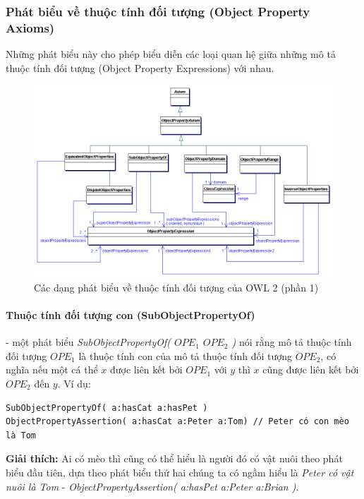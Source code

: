 \subsubsection{Phát biểu về thuộc tính đối tượng (Object Property Axioms)}
Những phát biểu này cho phép biểu diễn các loại quan hệ giữa những mô tả thuộc tính đối tượng (Object Property Expressions) với nhau.
\begin{figure}[h]
	\centering
	\includegraphics[width=160mm]{Figures/objectpropertyAxiom.png}
	\caption{Các dạng phát biểu về thuộc tính đối tượng của OWL 2 (phần 1)\label{overflow}}
\end{figure}

\paragraph{Thuộc tính đối tượng con (SubObjectPropertyOf)} - một phát biểu \textit{SubObjectPropertyOf( $OPE_{1}$ $OPE_{2}$ )} nói rằng mô tả thuộc tính đối tượng $OPE_{1}$ là thuộc tính con của mô tả thuộc tính đối tượng $OPE_{2}$, có nghĩa nếu một cá thể $x$ được liên kết bởi $OPE_{1}$ với $y$ thì $x$ cũng được liên kết bởi $OPE_{2}$ đến $y$. Ví dụ:
\begin{verbatim}
SubObjectPropertyOf( a:hasCat a:hasPet )     
ObjectPropertyAssertion( a:hasCat a:Peter a:Tom) // Peter có con mèo là Tom
\end{verbatim}
\textbf{Giải thích:} Ai có mèo thì cũng có thể hiểu là người đó có vật nuôi theo phát biểu đầu tiên, dựa theo phát biểu thứ hai chúng ta có ngầm hiểu là \textit{Peter có vật nuôi là Tom} - \textit{ObjectPropertyAssertion( a:hasPet a:Peter a:Brian )}.


